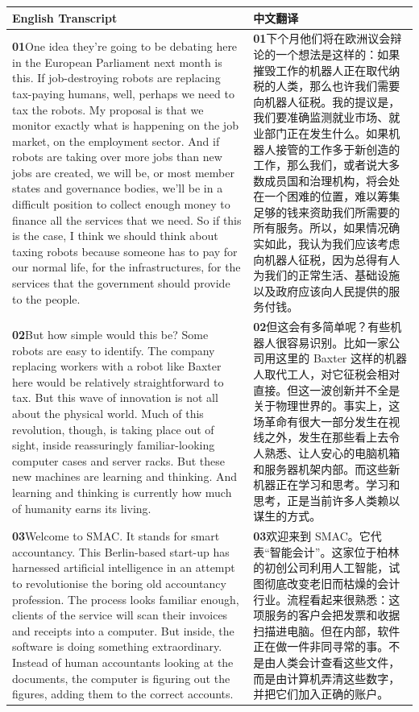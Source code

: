 \documentclass[UTF8,zihao=-4,fontset=fandol]{ctexart}
\newcommand{\TranscriptColumn}{\raggedright\arraybackslash\hyphenpenalty=10000\exhyphenpenalty=10000\sloppy}
\begin{document}
\renewcommand{\arraystretch}{1.23}
\begin{longtable}{>{\TranscriptColumn}p{} >{\TranscriptColumn}p{}}
\rowcolor{headerBg}\textbf{English Transcript} & \textbf{中文翻译} \\ \hline
\textbf{01}\quad One idea they're going to be debating here in the European Parliament next month is this. If job-destroying robots are replacing tax-paying humans, well, perhaps we need to tax the robots. My proposal is that we monitor exactly what is happening on the job market, on the employment sector. And if robots are taking over more jobs than new jobs are created, we will be, or most member states and governance bodies, we'll be in a difficult position to collect enough money to finance all the services that we need. So if this is the case, I think we should think about taxing robots because someone has to pay for our normal life, for the infrastructures, for the services that the government should provide to the people. & \textbf{01}\quad 下个月他们将在欧洲议会辩论的一个想法是这样的：如果摧毁工作的机器人正在取代纳税的人类，那么也许我们需要向机器人征税。我的提议是，我们要准确监测就业市场、就业部门正在发生什么。如果机器人接管的工作多于新创造的工作，那么我们，或者说大多数成员国和治理机构，将会处在一个困难的位置，难以筹集足够的钱来资助我们所需要的所有服务。所以，如果情况确实如此，我认为我们应该考虑向机器人征税，因为总得有人为我们的正常生活、基础设施以及政府应该向人民提供的服务付钱。 \\ \hline
\textbf{02}\quad But how simple would this be? Some robots are easy to identify. The company replacing workers with a robot like Baxter here would be relatively straightforward to tax. But this wave of innovation is not all about the physical world. Much of this revolution, though, is taking place out of sight, inside reassuringly familiar-looking computer cases and server racks. But these new machines are learning and thinking. And learning and thinking is currently how much of humanity earns its living. & \textbf{02}\quad 但这会有多简单呢？有些机器人很容易识别。比如一家公司用这里的 Baxter 这样的机器人取代工人，对它征税会相对直接。但这一波创新并不全是关于物理世界的。事实上，这场革命有很大一部分发生在视线之外，发生在那些看上去令人熟悉、让人安心的电脑机箱和服务器机架内部。而这些新机器正在学习和思考。学习和思考，正是当前许多人类赖以谋生的方式。 \\ \hline
\textbf{03}\quad Welcome to SMAC. It stands for smart accountancy. This Berlin-based start-up has harnessed artificial intelligence in an attempt to revolutionise the boring old accountancy profession. The process looks familiar enough, clients of the service will scan their invoices and receipts into a computer. But inside, the software is doing something extraordinary. Instead of human accountants looking at the documents, the computer is figuring out the figures, adding them to the correct accounts. & \textbf{03}\quad 欢迎来到 SMAC。它代表“智能会计”。这家位于柏林的初创公司利用人工智能，试图彻底改变老旧而枯燥的会计行业。流程看起来很熟悉：这项服务的客户会把发票和收据扫描进电脑。但在内部，软件正在做一件非同寻常的事。不是由人类会计查看这些文件，而是由计算机弄清这些数字，并把它们加入正确的账户。 \\ \hline

\end{longtable}
\end{document}
